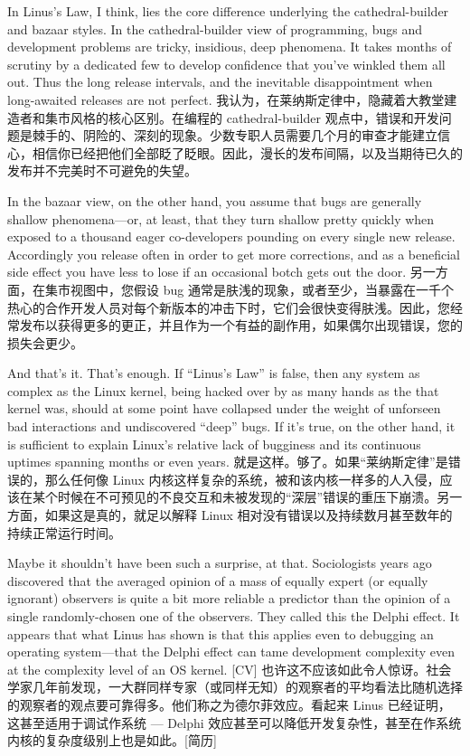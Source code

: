 \documentclass[a4paper,12pt,UTF8,twoside]{ctexbook}
\begin{document}
In Linus's Law, I think, lies the core difference underlying the cathedral-builder and bazaar styles. In the cathedral-builder view of programming, bugs and development problems are tricky, insidious, deep phenomena. It takes months of scrutiny by a dedicated few to develop confidence that you've winkled them all out. Thus the long release intervals, and the inevitable disappointment when long-awaited releases are not perfect.
我认为，在莱纳斯定律中，隐藏着大教堂建造者和集市风格的核心区别。在编程的 cathedral-builder 观点中，错误和开发问题是棘手的、阴险的、深刻的现象。少数专职人员需要几个月的审查才能建立信心，相信你已经把他们全部眨了眨眼。因此，漫长的发布间隔，以及当期待已久的发布并不完美时不可避免的失望。

In the bazaar view, on the other hand, you assume that bugs are generally shallow phenomena—or, at least, that they turn shallow pretty quickly when exposed to a thousand eager co-developers pounding on every single new release. Accordingly you release often in order to get more corrections, and as a beneficial side effect you have less to lose if an occasional botch gets out the door.
另一方面，在集市视图中，您假设 bug 通常是肤浅的现象，或者至少，当暴露在一千个热心的合作开发人员对每个新版本的冲击下时，它们会很快变得肤浅。因此，您经常发布以获得更多的更正，并且作为一个有益的副作用，如果偶尔出现错误，您的损失会更少。

And that's it. That's enough. If ``Linus's Law'' is false, then any system as complex as the Linux kernel, being hacked over by as many hands as the that kernel was, should at some point have collapsed under the weight of unforseen bad interactions and undiscovered ``deep'' bugs. If it's true, on the other hand, it is sufficient to explain Linux's relative lack of bugginess and its continuous uptimes spanning months or even years.
就是这样。够了。如果“莱纳斯定律”是错误的，那么任何像 Linux 内核这样复杂的系统，被和该内核一样多的人入侵，应该在某个时候在不可预见的不良交互和未被发现的“深层”错误的重压下崩溃。另一方面，如果这是真的，就足以解释 Linux 相对没有错误以及持续数月甚至数年的持续正常运行时间。

Maybe it shouldn't have been such a surprise, at that. Sociologists years ago discovered that the averaged opinion of a mass of equally expert (or equally ignorant) observers is quite a bit more reliable a predictor than the opinion of a single randomly-chosen one of the observers. They called this the Delphi effect. It appears that what Linus has shown is that this applies even to debugging an operating system—that the Delphi effect can tame development complexity even at the complexity level of an OS kernel. [CV]
也许这不应该如此令人惊讶。社会学家几年前发现，一大群同样专家（或同样无知）的观察者的平均看法比随机选择的观察者的观点要可靠得多。他们称之为德尔菲效应。看起来 Linus 已经证明，这甚至适用于调试作系统 — Delphi 效应甚至可以降低开发复杂性，甚至在作系统内核的复杂度级别上也是如此。[简历]
\end{document}
